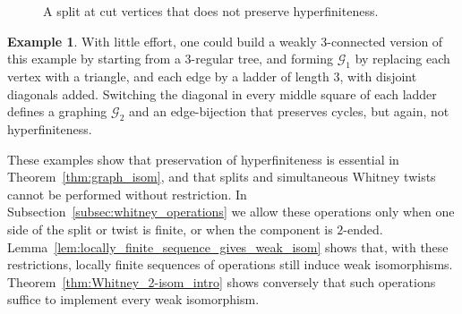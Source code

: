 \documentclass{article}
\theoremstyle{plain}
\theoremstyle{definition}
\newtheorem{ex}[thm]{Example}
\newcommand{\cG}{\mathcal{G}}
\begin{document}
\begin{figure}[htb]
{
}
\caption{A split at cut vertices that does not preserve hyperfiniteness.}\label{fig:split_destroys_hyperfinite}
\end{figure}

\begin{ex}    
With little effort, one could build a weakly $3$-connected version of this example by starting from a 3-regular tree, and forming $\cG_1$ by replacing each vertex with a triangle, and each edge by a ladder of length 3, with disjoint diagonals added. Switching the diagonal in every middle square of each ladder defines a graphing $\cG_2$ and an edge-bijection that preserves cycles, but again, not hyperfiniteness. 
\end{ex}

These examples show that preservation of hyperfiniteness is essential in Theorem~\ref{thm:graph_isom}, and that splits and simultaneous Whitney twists cannot be performed without restriction. In Subsection~\ref{subsec:whitney_operations} we allow these operations only when one side of the split or twist is finite, or when the component is $2$-ended. Lemma~\ref{lem:locally_finite_sequence_gives_weak_isom} shows that, with these restrictions, locally finite sequences of operations still induce weak isomorphisms. Theorem~\ref{thm:Whitney_2-isom_intro} shows conversely that such operations suffice to implement every weak isomorphism.
\end{document}
